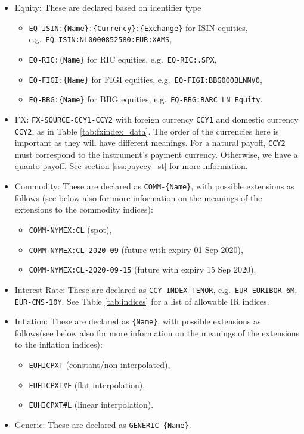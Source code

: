 \begin{itemize}
\item Equity: These are declared based on identifier type \begin{itemize}
    \item \verb+EQ-ISIN:{Name}:{Currency}:{Exchange}+ for ISIN equities,\\e.g.\ \verb+EQ-ISIN:NL0000852580:EUR:XAMS+,
    \item \verb+EQ-RIC:{Name}+ for RIC equities, e.g.\ \verb+EQ-RIC:.SPX+,
    \item \verb+EQ-FIGI:{Name}+ for FIGI equities, e.g.\ \verb+EQ-FIGI:BBG000BLNNV0+,
    \item \verb+EQ-BBG:{Name}+ for BBG equities, e.g.\ \verb+EQ-BBG:BARC LN Equity+.
  \end{itemize}
\item FX: \verb+FX-SOURCE-CCY1-CCY2+ with foreign currency \verb+CCY1+ and domestic currency \verb+CCY2+\ifdefined\STModuleDoc\else, as in Table \ref{tab:fxindex_data}\fi.
  The order of the currencies here is important as they will have different meanings. For a natural payoff, \verb+CCY2+ must correspond
  to the instrument's payment currency. Otherwise, we have a quanto payoff. See section \ref{sss:payccy_st} for more information.
\item Commodity: These are declared as \verb+COMM-{Name}+, with possible extensions as follows (see below also for
  more information on the meanings of the extensions to the commodity indices): \begin{itemize}
    \item \verb+COMM-NYMEX:CL+ (spot),
    \item \verb+COMM-NYMEX:CL-2020-09+ (future with expiry 01 Sep 2020),
    \item \verb+COMM-NYMEX:CL-2020-09-15+ (future with expiry 15 Sep 2020).
  \end{itemize}
\item Interest Rate: These are declared as \verb+CCY-INDEX-TENOR+, e.g.\ \verb+EUR-EURIBOR-6M+, \verb+EUR-CMS-10Y+.
  \ifdefined\STModuleDoc\else See Table \ref{tab:indices} for a list of allowable IR indices. \fi
\item Inflation: These are declared as \verb+{Name}+, with possible extensions as follows(see below also for more
  information on the meanings of the extensions to the inflation indices): \begin{itemize}
    \item \verb+EUHICPXT+ (constant/non-interpolated),
    \item \verb+EUHICPXT#F+ (flat interpolation),
    \item \verb+EUHICPXT#L+ (linear interpolation).
  \end{itemize}
\item Generic: These are declared as \verb+GENERIC-{Name}+.
\end{itemize}


